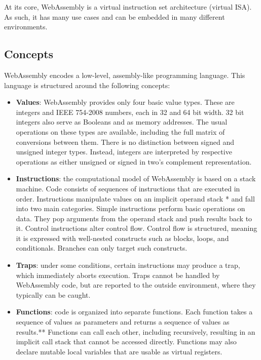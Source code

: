 At its core, WebAssembly is a virtual instruction set architecture (virtual ISA). As such, it has many use cases and can be embedded in many different environments.

\subsection{Concepts} \cite{wasm1}

WebAssembly encodes a low-level, assembly-like programming language. 
This language is structured around the following concepts:

\begin{itemize} 
  
  \item \textbf{Values}:
  WebAssembly provides only four basic value types. 
  These are integers and IEEE 754-2008 numbers, each in 32 and 64 bit width. 32 bit integers also serve as Booleans and as memory addresses. The usual operations on these types are available, including the full matrix of conversions between them. There is no distinction between signed and unsigned integer types. Instead, integers are interpreted by respective operations as either unsigned or signed in two’s complement representation.
  
  \item \textbf{Instructions}:
  the computational model of WebAssembly is based on a stack machine. 
  Code consists of sequences of instructions that are executed in order. 
  Instructions manipulate values on an implicit operand stack * and fall into two main categories. 
  Simple instructions perform basic operations on data. They pop arguments from the operand stack and push results back to it. 
  Control instructions alter control flow. 
  Control flow is structured, meaning it is expressed with well-nested constructs such as blocks, loops, and conditionals. 
  Branches can only target such constructs.
  
  \item \textbf{Traps}:
  under some conditions, certain instructions may produce a trap, which immediately aborts execution. 
  Traps cannot be handled by WebAssembly code, but are reported to the outside environment, where they typically can be caught.
  
  \item \textbf{Functions}:
  code is organized into separate functions. 
  Each function takes a sequence of values as parameters and returns a sequence of values as results.** 
  Functions can call each other, including recursively, resulting in an implicit call stack that cannot be accessed directly. 
  Functions may also declare mutable local variables that are usable as virtual registers.
  

\end{itemize}

